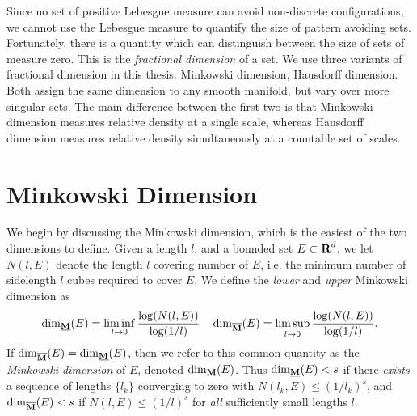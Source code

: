 Since no set of positive Lebesgue measure can avoid non-discrete configurations, we cannot use the Lebesgue measure to quantify the size of pattern avoiding sets. Fortunately, there is a quantity which can distinguish between the size of sets of measure zero. This is the \emph{fractional dimension} of a set. We use three variants of fractional dimension in this thesis: Minkowski dimension, Hausdorff dimension. Both assign the same dimension to any smooth manifold, but vary over more singular sets. The main difference between the first two is that Minkowski dimension measures relative density at a single scale, whereas Hausdorff dimension measures relative density simultaneously at a countable set of scales.







\section{Minkowski Dimension}

We begin by discussing the Minkowski dimension, which is the easiest of the two dimensions to define. Given a length $l$, and a bounded set $E \subset \operatorname{\mathbf{R}}^d$, we let $N(l,E)$ denote the length $l$ covering number of $E$, i.e. the minimum number of sidelength $l$ cubes required to cover $E$. We define the \emph{lower} and \emph{upper} Minkowski dimension as
%
\[ \operatorname{\dim_{\underline{\mathbf{M}}}}(E) = \liminf_{l \to 0} \frac{\log(N(l,E))}{\log(1/l)} \quad \operatorname{\dim_{\overline{\mathbf{M}}}}(E) = \limsup_{l \to 0} \frac{\log(N(l,E))}{\log(1/l)}. \]
%
If $\operatorname{\dim_{\overline{\mathbf{M}}}}(E) = \operatorname{\dim_{\underline{\mathbf{M}}}}(E)$, then we refer to this common quantity as the \emph{Minkowski dimension} of $E$, denoted $\operatorname{\dim_{\mathbf{M}}}(E)$. Thus $\operatorname{\dim_{\underline{\mathbf{M}}}}(E) < s$ if there {\it exists} a sequence of lengths $\{ l_k \}$ converging to zero with $N(l_k,E) \leq (1/l_k)^s$, and $\operatorname{\dim_{\overline{\mathbf{M}}}}(E) < s$ if $N(l,E) \leq (1/l)^s$ for \emph{all} sufficiently small lengths $l$.


